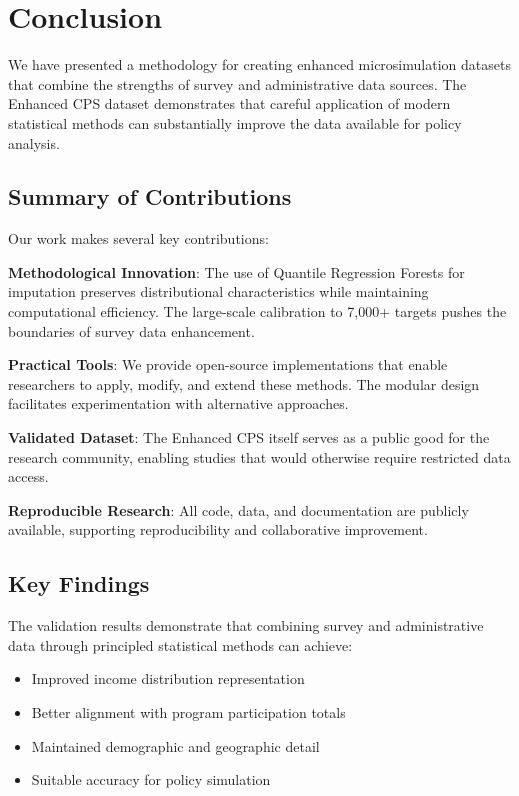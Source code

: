 \section{Conclusion}

We have presented a methodology for creating enhanced microsimulation datasets that combine the strengths of survey and administrative data sources. The Enhanced CPS dataset demonstrates that careful application of modern statistical methods can substantially improve the data available for policy analysis.

\subsection{Summary of Contributions}

Our work makes several key contributions:

\textbf{Methodological Innovation}: The use of Quantile Regression Forests for imputation preserves distributional characteristics while maintaining computational efficiency. The large-scale calibration to 7,000+ targets pushes the boundaries of survey data enhancement.

\textbf{Practical Tools}: We provide open-source implementations that enable researchers to apply, modify, and extend these methods. The modular design facilitates experimentation with alternative approaches.

\textbf{Validated Dataset}: The Enhanced CPS itself serves as a public good for the research community, enabling studies that would otherwise require restricted data access.

\textbf{Reproducible Research}: All code, data, and documentation are publicly available, supporting reproducibility and collaborative improvement.

\subsection{Key Findings}

The validation results demonstrate that combining survey and administrative data through principled statistical methods can achieve:
\begin{itemize}
\item Improved income distribution representation
\item Better alignment with program participation totals  
\item Maintained demographic and geographic detail
\item Suitable accuracy for policy simulation
\end{itemize}

